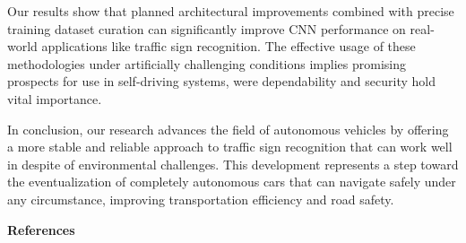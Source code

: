 \begin{multicols}{2}
Our results show that planned architectural improvements combined with
precise training dataset curation can significantly improve CNN
performance on real-world applications like traffic sign recognition.
The effective usage of these methodologies under artificially
challenging conditions implies promising prospects for use in
self-driving systems, were dependability and security hold vital
importance.

In conclusion, our research advances the field of autonomous vehicles by
offering a more stable and reliable approach to traffic sign recognition
that can work well in despite of environmental challenges. This
development represents a step toward the eventualization of completely
autonomous cars that can navigate safely under any circumstance,
improving transportation efficiency and road safety.
\end{multicols}
\newpage
\begin{center}
{\bfseries References}
\end{center}

